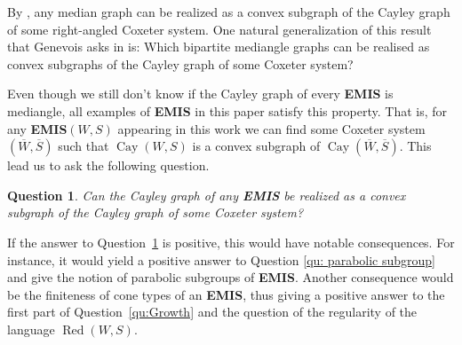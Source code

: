 \documentclass[A4paper, oneside]{amsart}
\newcommand{\Red}{\operatorname{Red}}
\newcommand{\Cay}{\operatorname{Cay}}
\newcommand{\EMIS}{\textnormal{\bf EMIS}\xspace}
\newtheorem{question}{Question}
\theoremstyle{definition}
\begin{document}
By \cite{HaglundWise}, any median graph can be realized as a convex subgraph of the Cayley graph of some right-angled Coxeter system. One natural generalization of this result that Genevois asks in \cite{genevois2022rotation} is: Which bipartite mediangle graphs can be realised as convex subgraphs of the Cayley graph of some Coxeter system?

Even though we still don't know if the Cayley graph of every \EMIS is mediangle, all examples of \EMIS in this paper satisfy this property. That is, for any \EMIS $(W,S)$ appearing in this work we can find some Coxeter system $(\overline{W}, \overline{S})$ such that $\Cay(W,S)$ is a convex subgraph of $\Cay(\overline{W}, \overline{S})$. This lead us to ask the following question.

 \begin{question} \label{qu: convex subgraph}
 	Can the Cayley graph of any \EMIS be realized as a convex subgraph of the Cayley graph of some Coxeter system?
 \end{question}
 
 If the answer to Question~\ref{qu: convex subgraph} is positive, this would have notable consequences. For instance, it would yield a positive answer to Question \ref{qu: parabolic subgroup} and give the notion of parabolic subgroups of \EMIS. Another consequence would be the finiteness of cone types of an \EMIS, thus giving a positive answer to the first part of Question~\ref{qu:Growth} and the question of the regularity of the language $\Red(W,S)$.
 




\setlength{\tabcolsep}{10pt} %
\renewcommand{\arraystretch}{2} %

\clearpage
\end{document}
